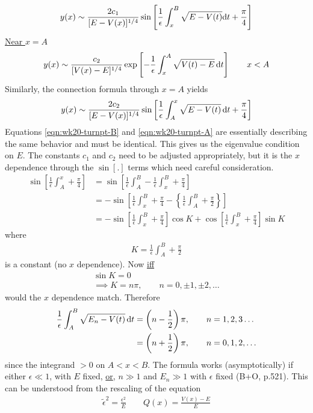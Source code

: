 \begin{align}
	y(x) \sim \frac{2 c_1}{[E-V(x)]^{1/4}} \sin \left[\frac{1}{\epsilon} \int_{x}^{B} \sqrt{E - V(t)} \mathrm{d} t + \frac{\pi}{4}\right] \label{eqn:wk20-turnpt-B}
\end{align}
\underline{Near $x=A$} 
\begin{gather*}
	y(x) \sim \frac{c_2}{[V(x)-E]^{1/4}} \exp\left[-\frac{1}{\epsilon} \int_{x}^{A} \sqrt{V(t)-E} \, \mathrm{d} t\right] \qquad x<A
\end{gather*}
Similarly, the connection formula through $x=A$ yields
\begin{gather}
	y(x) \sim \frac{2c_2}{[E-V(x)]^{1/4}} \sin \left[\frac{1}{\epsilon} \int_{A}^{x} \sqrt{E-V(t)}\, \mathrm{d} t + \frac{\pi}{4}\right] \label{eqn:wk20-turnpt-A}
\end{gather}
Equations \ref{eqn:wk20-turnpt-B} and \ref{eqn:wk20-turnpt-A} are essentially describing the same behavior and must be identical. This gives us the eigenvalue condition on $E$. The constants $c_1$ and $c_2$ need to be adjusted appropriately, but it is the $x$ dependence through the $\sin[.]$ terms which need careful consideration. 
\begin{align*}
	\sin \left[\frac{1}{\epsilon} \int_{A}^{x} + \frac{\pi}{4}\right] &= \sin \left[\frac{1}{\epsilon}\int_{A}^{B} - \frac{1}{\epsilon}\int_{x}^{B} + \frac{\pi}{4}\right] \\
	&= -\sin \left[\frac{1}{\epsilon}\int_{x}^{B} + \frac{\pi}{4} - \left\{ \frac{1}{\epsilon}\int_{A}^{B} + \frac{\pi}{2} \right\} \right] \\
	&= -\sin \left[\frac{1}{\epsilon} \int_{x}^{B} + \frac{\pi}{4}\right] \cos K + \cos\left[\frac{1}{\epsilon} \int_{x}^{B} + \frac{\pi}{4}\right] \sin K
\end{align*}
where
\begin{gather*}
	K = \frac{1}{\epsilon} \int_{A}^{B} + \frac{\pi}{2}
\end{gather*}
is a constant (no $x$ dependence). Now \underline{iff}
\begin{gather*}
	\sin K = 0 \\
	\implies K = n\pi, \qquad n=0,\pm 1,\pm 2, \dots 
\end{gather*}
would the $x$ dependence match. Therefore
\begin{align*}
	\frac{1}{\epsilon} \int_{A}^{B} \sqrt{E_n-V(t)} \, \mathrm{d} t &= \left(n-\frac{1}{2}\right)\pi, \qquad n=1,2,3 \dots \\
	&= \left(n+\frac{1}{2}\right)\pi, \qquad n = 0,1,2, \dots 
\end{align*}
since the integrand $>0$ on $A<x<B$. The formula works (asymptotically) if either $\epsilon \ll 1$, with $E$ fixed, \underline{or}, $n\gg 1$ and $E_n \gg 1$ with $\epsilon$ fixed (B+O, p.521). This can be understood from the rescaling of the equation
\begin{gather*}
	\tilde{\epsilon}^2 = \frac{\epsilon^2}{E} \qquad Q(x) = \frac{V(x)-E}{E}
\end{gather*}



